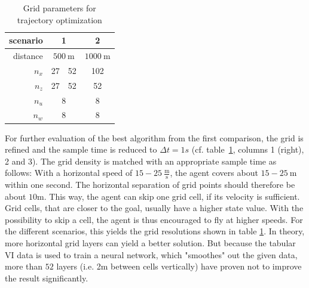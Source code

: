 \begin{table}[htb]
	\begin{center}
		\begin{tabular}{r|c c c }
			scenario &\multicolumn{2}{c}{1} & 2  \\ \hline
			distance &\multicolumn{2}{c}{$500~\text{m}$}  & $1000~\text{m}$ \\
			$n_x$ & 27 & 52 & 102  \\
			$n_z$ & 27 & 52 & 52 \\
			$n_u$ &\multicolumn{2}{c}{8}& 8 \\
			$n_w$ &\multicolumn{2}{c}{8}& 8
		\end{tabular}
	\end{center}
	\caption{Grid parameters for trajectory optimization}
	\label{tab:grids}
\end{table}


For further evaluation of the best algorithm from the first comparison, the grid is refined and the sample time is reduced to $\Delta t = 1s$ (cf. table~\ref{tab:grids}, columns 1 (right), 2 and 3). The grid density is matched with an appropriate sample time as follows:
With a horizontal speed of $15-25 ~\frac{\text{m}}{\text{s}}$, the agent covers about $15-25~\text{m}$ within one second. The horizontal separation of grid points should therefore be about $10$m. This way, the agent can skip one grid cell, if its velocity is sufficient. Grid cells, that are closer to the goal, usually have a higher state value. With the possibility to skip a cell, the agent is thus encouraged to fly at higher speeds. For the different scenarios, this yields the grid resolutions shown in table \ref{tab:grids}. In theory, more horizontal grid layers can yield a better solution. But because the tabular VI data is used to train a neural network, which "smoothes" out the given data, more than $52$ layers (i.e. 2m between cells vertically) have proven not to improve the result significantly.

